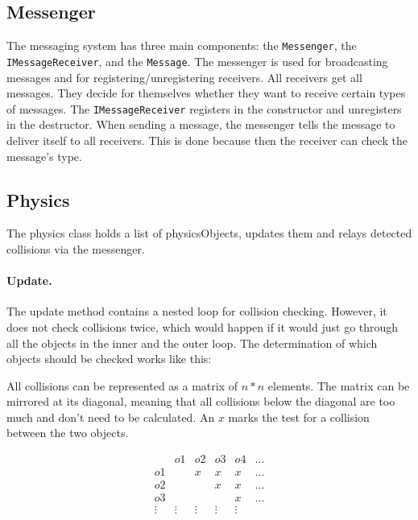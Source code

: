 \documentclass[12pt]{article}
\begin{document}
\subsection{Messenger}
\label{subsection:Messenger}

The messaging system has three main components: the \texttt{Messenger}, the \texttt{IMessageReceiver}, and the \texttt{Message}. The messenger is used for broadcasting messages and for registering/unregistering receivers. All receivers get all messages. They decide for themselves whether they want to receive certain types of messages. The \texttt{IMessageReceiver} registers in the constructor and unregisters in the destructor. When sending a message, the messenger tells the message to deliver itself to all receivers. This is done because then the receiver can check the message's type.

\subsection{Physics}
\label{subsection:Physics}

The physics class holds a list of physicsObjects, updates them and relays detected collisions via the messenger.

\paragraph{Update.} The update method contains a nested loop for collision checking. However, it does not check collisions twice, which would happen if it would just go through all the objects in the inner and the outer loop. The determination of which objects should be checked works like this:\newline

All collisions can be represented as a matrix of $n*n$ elements. The matrix can be mirrored at its diagonal, meaning that all collisions below the diagonal are too much and don't need to be calculated. An $x$ marks the test for a collision between the two objects.

\begin{displaymath}
\begin{matrix}
	&	o1	&	o2	& o3 	& o4 	& \dots \\
o1	&		&	x	&	x	&	x	& \dots \\
o2 &		&		&	x	&	x	& \dots \\
o3	&		&		&		& 	x	& \dots \\
\vdots & \vdots & \vdots & \vdots & \vdots
\end{matrix}
\end{displaymath}
\end{document}
